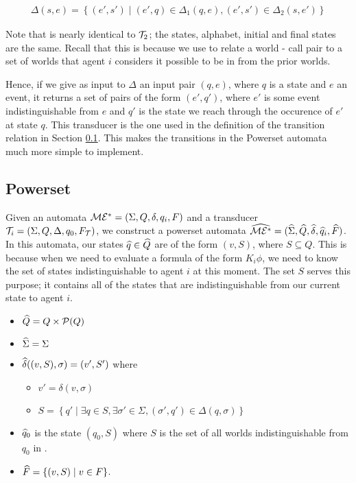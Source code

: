 \documentclass[10pt, a4paper]{report}
\begin{document}
\begin{align*}
  \Delta(s, e) = \left\{ (e', s') \mid (e', q) \in \Delta_1(q, e), (e', s') \in \Delta_2(s, e') \right\} 
\end{align*}

Note that  is nearly identical to $\mathcal{T}_2$; the states, alphabet,
initial and final states are the same. Recall that this is because we use
 to relate a world - call pair to a set of worlds that agent $i$
considers it possible to be in from the prior worlds. 

Hence, if we give as input to $\Delta$ an input pair $(q, e)$, where $q$ is a
state and $e$ an event, it returns a set of pairs of the form $(e', q')$, where
$e'$ is some event indistinguishable from $e$ and $q'$ is the state we reach
through the occurence of $e'$ at state $q$. This transducer is the one used in
the definition of the transition relation in Section \ref{sec:Powerset}.
This makes the transitions in the Powerset automata much more simple to
implement.

\subsection{Powerset}
\label{sec:Powerset}

Given an automata $\mathcal{ME^\ast} = (\Sigma, Q, \delta, q_i, F)$ and a transducer
$\mathcal{T}_i = (\Sigma, Q, \Delta, q_0, F_{\mathcal{T}})$, we construct a powerset
automata $\widehat{\mathcal{ME^\ast}} = (\widehat{\Sigma}, \widehat{Q}, \widehat{\delta}, \widehat{q}_i,
\widehat{F})$. In this automata, our states $\widehat{q} \in \widehat{Q}$ are of the form $(v,
S)$, where $S \subseteq Q$. This is because when we need to evaluate a formula
of the form $K_i\phi$, we need to know the set of states indistinguishable
to agent $i$ at this moment. The set $S$ serves this purpose; it contains all of
the states that are indistinguishable from our current state to agent $i$.

\begin{itemize}
\item $\widehat{Q} = Q \times \mathcal{P}(Q)$
\item $\widehat{\Sigma} = \Sigma$ 
\item $\widehat{\delta}((v, S), \sigma) = (v', S')$ where
  \begin{itemize}
  \item $v' =  \delta(v, \sigma)$
  \item $S = \left\{q' \mid \exists q \in S, \exists \sigma' \in \Sigma,
      (\sigma', q') \in \Delta(q, \sigma) \right\}$
  \end{itemize}
\item $\widehat{q}_0$ is the state $(q_0, S)$ where $S$ is the set of all worlds
  indistinguishable from $q_0$ in \mestar.
\item $\widehat{F} = \left\{ (v, S) \mid v \in F \right\}$.
\end{itemize}
\end{document}
